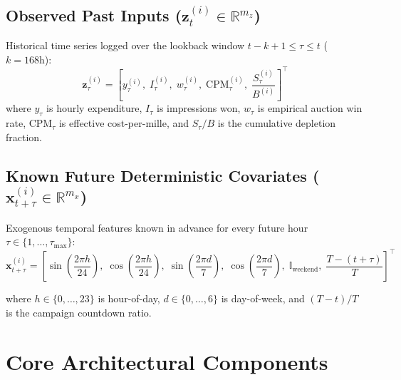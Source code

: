 \documentclass[11pt,a4paper]{article}
\begin{document}
\subsection{Observed Past Inputs (\texorpdfstring{$\mathbf{z}_t^{(i)} \in \mathbb{R}^{m_z}$}{z_t})}
Historical time series logged over the lookback window $t-k+1 \le \tau \le t$ ($k=168\text{h}$):
\begin{equation}
    \mathbf{z}_\tau^{(i)} = \left[ y_\tau^{(i)}, \; I_\tau^{(i)}, \; w_\tau^{(i)}, \; \text{CPM}_\tau^{(i)}, \; \frac{S_\tau^{(i)}}{B^{(i)}} \right]^\top
\end{equation}
where $y_\tau$ is hourly expenditure, $I_\tau$ is impressions won, $w_\tau$ is empirical auction win rate, $\text{CPM}_\tau$ is effective cost-per-mille, and $S_\tau / B$ is the cumulative depletion fraction.

\subsection{Known Future Deterministic Covariates (\texorpdfstring{$\mathbf{x}_{t+\tau}^{(i)} \in \mathbb{R}^{m_x}$}{x_t})}
Exogenous temporal features known in advance for every future hour $\tau \in \{1, \dots, \tau_{\max}\}$:
\begin{equation}
    \mathbf{x}_{t+\tau}^{(i)} = \left[ \sin\left(\frac{2\pi h}{24}\right), \; \cos\left(\frac{2\pi h}{24}\right), \; \sin\left(\frac{2\pi d}{7}\right), \; \cos\left(\frac{2\pi d}{7}\right), \; \mathbb{I}_{\text{weekend}}, \; \frac{T - (t+\tau)}{T} \right]^\top
\end{equation}

where $h \in \{0, \dots, 23\}$ is hour-of-day, $d \in \{0, \dots, 6\}$ is day-of-week, and $(T - t)/T$ is the campaign countdown ratio.

\section{Core Architectural Components}
\end{document}
